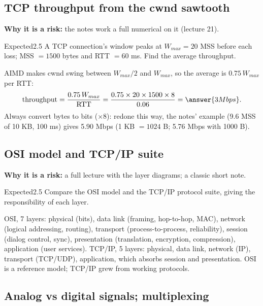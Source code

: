 \subsection{TCP throughput from the cwnd sawtooth}\label{iq:C37}
   

\textbf{Why it is a risk:} the notes work a full numerical on it (lecture 21).
\begin{question}{Expected}{2.5}
A TCP connection's window peaks at $W_{max}=20$ MSS before each loss; MSS $=1500$ bytes and RTT $=60$ ms. Find the average throughput.
\end{question}
\begin{solution}
AIMD makes cwnd swing between $W_{max}/2$ and $W_{max}$, so the average is $0.75\,W_{max}$ per RTT:
\[ \text{throughput} = \frac{0.75\,W_{max}}{\text{RTT}} = \frac{0.75\times20\times1500\times8}{0.06} = \answer{3 Mbps}. \]
Always convert bytes to bits ($\times8$): redone this way, the notes' example (9.6 MSS of 10 KB, 100 ms) gives 5.90 Mbps (1 KB $=1024$ B; 5.76 Mbps with 1000 B).
\end{solution}

\subsection{OSI model and TCP/IP suite}\label{iq:C07}
   

\textbf{Why it is a risk:} a full lecture with the layer diagrams; a classic short note.
\begin{question}{Expected}{2.5}
Compare the OSI model and the TCP/IP protocol suite, giving the responsibility of each layer.
\end{question}
\begin{solution}
OSI, 7 layers: physical (bits), data link (framing, hop-to-hop, MAC), network (logical addressing, routing), transport (process-to-process, reliability), session (dialog control, sync), presentation (translation, encryption, compression), application (user services). TCP/IP, 5 layers: physical, data link, network (IP), transport (TCP/UDP), application, which absorbs session and presentation. OSI is a reference model; TCP/IP grew from working protocols.
\end{solution}

\subsection{Analog vs digital signals; multiplexing}\label{iq:C08}
   

